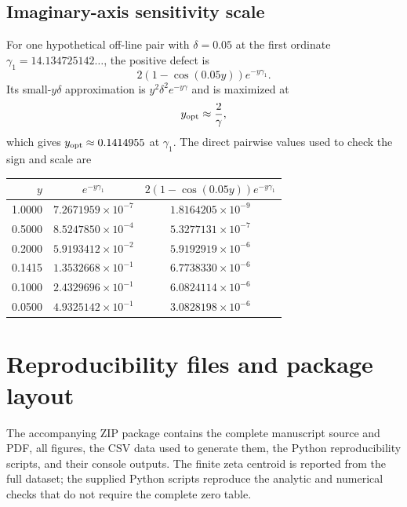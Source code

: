 \documentclass[11pt]{amsart}
\numberwithin{equation}{section}
\theoremstyle{definition}
\theoremstyle{remark}
\begin{document}
\subsection{Imaginary-axis sensitivity scale}\label{subsec:annex_rh_sensitivity}
For one hypothetical off-line pair with $\delta=0.05$ at the first ordinate $\gamma_1=14.134725142\ldots$, the positive defect is
\begin{equation}\label{eq:annex_pair_defect}
2(1-\cos(0.05y))e^{-y\gamma_1}.
\end{equation}
Its small-$y\delta$ approximation is $y^2\delta^2e^{-y\gamma}$ and is maximized at
\begin{equation}\label{eq:annex_yopt}
y_{\rm opt}\approx\frac{2}{\gamma},
\end{equation}
which gives $y_{\rm opt}\approx0.1414955$ at $\gamma_1$.
The direct pairwise values used to check the sign and scale are
\begin{center}
\small
\begin{tabular}{rcc}
\toprule
$y$ & $e^{-y\gamma_1}$ & $2(1-\cos(0.05y))e^{-y\gamma_1}$\\
\midrule
1.0000 & $7.2671959\times10^{-7}$ & $1.8164205\times10^{-9}$\\
0.5000 & $8.5247850\times10^{-4}$ & $5.3277131\times10^{-7}$\\
0.2000 & $5.9193412\times10^{-2}$ & $5.9192919\times10^{-6}$\\
0.1415 & $1.3532668\times10^{-1}$ & $6.7738330\times10^{-6}$\\
0.1000 & $2.4329696\times10^{-1}$ & $6.0824114\times10^{-6}$\\
0.0500 & $4.9325142\times10^{-1}$ & $3.0828198\times10^{-6}$\\
\bottomrule
\end{tabular}
\end{center}

\section{Reproducibility files and package layout}\label{sec:reproducibility}
The accompanying ZIP package contains the complete manuscript source and PDF, all figures, the CSV data used to generate them, the Python reproducibility scripts, and their console outputs. The finite zeta centroid is reported from the full dataset; the supplied Python scripts reproduce the analytic and numerical checks that do not require the complete zero table.
\end{document}
